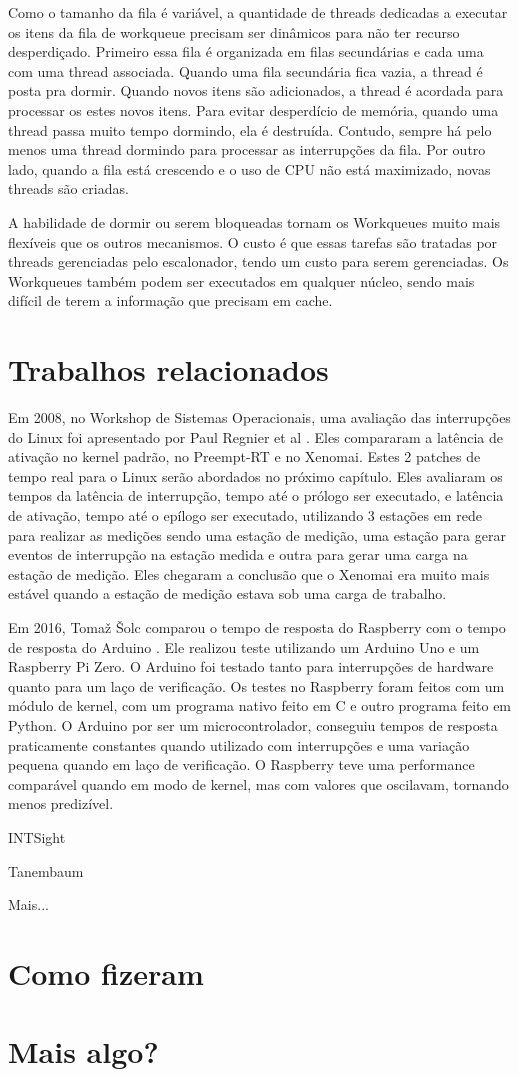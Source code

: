 Como o tamanho da fila é variável, a quantidade de threads dedicadas a executar os itens da fila de workqueue precisam ser dinâmicos para não ter recurso desperdiçado. Primeiro essa fila é organizada em filas secundárias e cada uma com uma thread associada. Quando uma fila secundária fica vazia, a thread é posta pra dormir. Quando novos itens são adicionados, a thread é acordada para processar os estes novos itens. Para evitar desperdício de memória, quando uma thread passa muito tempo dormindo, ela é destruída. Contudo, sempre há pelo menos uma thread dormindo para processar as interrupções da fila. Por outro lado, quando a fila está crescendo e o uso de CPU não está maximizado, novas threads são criadas.

A habilidade de dormir ou serem bloqueadas tornam os Workqueues muito mais flexíveis que os outros mecanismos. O custo é que essas tarefas são tratadas por threads gerenciadas pelo escalonador, tendo um custo para serem gerenciadas. Os Workqueues também podem ser executados em qualquer núcleo, sendo mais difícil de terem a informação que precisam em cache.

\section{Trabalhos relacionados}

Em 2008, no Workshop de Sistemas Operacionais, uma avaliação das interrupções do Linux foi apresentado por Paul Regnier et al \cite{Regnier2008}. Eles compararam a latência de ativação no kernel padrão, no Preempt-RT e no Xenomai. Estes 2 patches de tempo real para o Linux serão abordados no próximo capítulo. Eles avaliaram os tempos da latência de interrupção, tempo até o prólogo ser executado, e latência de ativação, tempo até o epílogo ser executado, utilizando 3 estações em rede para realizar as medições sendo uma estação de medição, uma estação para gerar eventos de interrupção na estação medida e outra para gerar uma carga na estação de medição. Eles chegaram a conclusão que o Xenomai era muito mais estável quando a estação de medição estava sob uma carga de trabalho.

Em 2016, Tomaž Šolc comparou o tempo de resposta do Raspberry com o tempo de resposta do Arduino \cite{Solc2016}. Ele realizou teste utilizando um Arduino Uno e um Raspberry Pi Zero. O Arduino foi testado tanto para interrupções de hardware quanto para um laço de verificação. Os testes no Raspberry foram feitos com um módulo de kernel, com um programa nativo feito em C e outro programa feito em Python. O Arduino por ser um microcontrolador, conseguiu tempos de resposta praticamente constantes quando utilizado com interrupções e uma variação pequena quando em laço de verificação. O Raspberry teve uma performance comparável quando em modo de kernel, mas com valores que oscilavam, tornando menos predizível.

INTSight \cite{Gerhorst2018}

Tanembaum \cite{Tanenbaum2016}

Mais...

\section{Como fizeram}
\section{Mais algo?}